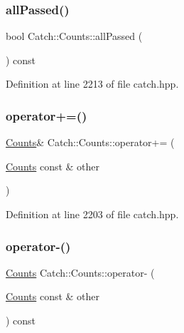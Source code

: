 \hypertarget{struct_catch_1_1_counts_a84999490e0ecaa3de5e121bf48eda1b3}{}\label{struct_catch_1_1_counts_a84999490e0ecaa3de5e121bf48eda1b3} 
\subsubsection{\texorpdfstring{all\+Passed()}{allPassed()}}
{\footnotesize\ttfamily bool Catch\+::\+Counts\+::all\+Passed (\begin{DoxyParamCaption}{ }\end{DoxyParamCaption}) const\hspace{0.3cm}{\ttfamily [inline]}}



Definition at line 2213 of file catch.\+hpp.

\hypertarget{struct_catch_1_1_counts_a322a89475cd2cc039140ef371e973677}{}\label{struct_catch_1_1_counts_a322a89475cd2cc039140ef371e973677} 
\subsubsection{\texorpdfstring{operator+=()}{operator+=()}}
{\footnotesize\ttfamily \hyperlink{struct_catch_1_1_counts}{Counts}\& Catch\+::\+Counts\+::operator+= (\begin{DoxyParamCaption}\item[{\hyperlink{struct_catch_1_1_counts}{Counts} const \&}]{other }\end{DoxyParamCaption})\hspace{0.3cm}{\ttfamily [inline]}}



Definition at line 2203 of file catch.\+hpp.

\hypertarget{struct_catch_1_1_counts_aaa10666f559057e3e860d2a5a6fae4c4}{}\label{struct_catch_1_1_counts_aaa10666f559057e3e860d2a5a6fae4c4} 
\subsubsection{\texorpdfstring{operator-\/()}{operator-()}}
{\footnotesize\ttfamily \hyperlink{struct_catch_1_1_counts}{Counts} Catch\+::\+Counts\+::operator-\/ (\begin{DoxyParamCaption}\item[{\hyperlink{struct_catch_1_1_counts}{Counts} const \&}]{other }\end{DoxyParamCaption}) const\hspace{0.3cm}{\ttfamily [inline]}}



